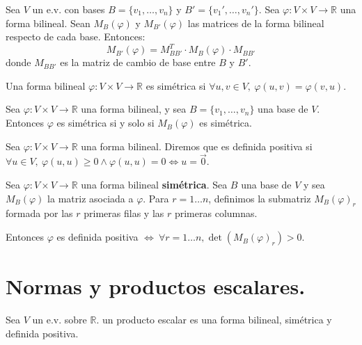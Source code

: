 \documentclass[14pt]{book}
\begin{document}
\begin{tm}
	Sea $V$ un e.v. con bases $B = \{v_1, \dots, v_n\}$ y $B' = \{v_1', \dots, v_n'\}$. Sea $\varphi: V \times V \to \mathbb{R}$ una forma bilineal. Sean $M_B(\varphi)$ y $M_{B'}(\varphi)$ las matrices de la forma bilineal respecto de cada base. Entonces:
	\[
		M_{B'}(\varphi) = M_{BB'}^T \cdot M_B(\varphi) \cdot M_{BB'}
	\]
	donde $M_{BB'}$ es la matriz de cambio de base entre $B$ y $B'$.
\end{tm}

\begin{dfn}
	Una forma bilineal $\varphi : V \times V \to \mathbb{R}$ es simétrica si $\forall u, v \in V,\ \varphi(u, v) = \varphi(v, u)$.
\end{dfn}

\begin{tm}
	Sea $\varphi : V\times V \to \mathbb{R}$ una forma bilineal, y sea $B = \{v_1, \dots, v_n\}$ una base de $V$. Entonces $\varphi$ es simétrica si y solo si $M_B(\varphi)$ es simétrica.
\end{tm}

\begin{dfn}
	Sea $\varphi : V \times V \to \mathbb{R}$ una forma bilineal. Diremos que es definida positiva si $\forall u \in V,\ \varphi(u, u) \geq 0 \land \varphi(u, u) = 0 \iff u = \overrightarrow{0}$.
\end{dfn}

\begin{tm}
	Sea $\varphi: V \times V \to \mathbb{R}$ una forma bilineal \textbf{simétrica}. Sea $B$ una base de $V$ y sea $M_B (\varphi)$ la matriz asociada a $\varphi$. Para $r = 1 \dots n$, definimos la submatriz $M_B(\varphi)_r$ formada por las $r$ primeras filas y las $r$ primeras columnas.
	
	Entonces $\varphi$ es definida positiva $\iff\ \forall r = 1\dots n, \det(M_B(\varphi)_r) > 0$. 
\end{tm}

\section{Normas y productos escalares.}
\begin{dfn}
	Sea $V$ un e.v. sobre $\mathbb{R}$. un producto escalar es una forma bilineal, simétrica y definida positiva.
\end{dfn}
\end{document}
